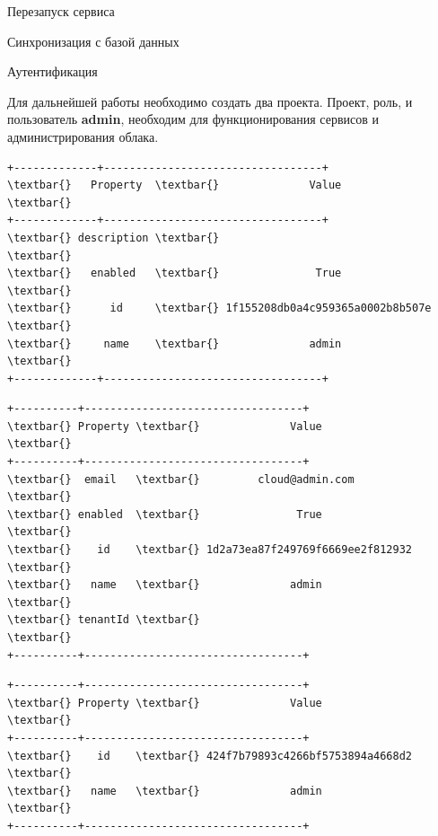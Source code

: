 \documentclass[letterpaper,10pt,russian]{sphinxmanual}
\begin{document}
Перезапуск сервиса


Синхронизация с базой данных


Аутентификация



Для дальнейшей работы необходимо создать два проекта. Проект, роль, и пользователь \textbf{admin}, необходим для функционирования сервисов и администрирования облака.


\begin{Verbatim}[commandchars=\\\{\}]
+-------------+----------------------------------+
\textbar{}   Property  \textbar{}              Value               \textbar{}
+-------------+----------------------------------+
\textbar{} description \textbar{}                                  \textbar{}
\textbar{}   enabled   \textbar{}               True               \textbar{}
\textbar{}      id     \textbar{} 1f155208db0a4c959365a0002b8b507e \textbar{}
\textbar{}     name    \textbar{}              admin               \textbar{}
+-------------+----------------------------------+
\end{Verbatim}


\begin{Verbatim}[commandchars=\\\{\}]
+----------+----------------------------------+
\textbar{} Property \textbar{}              Value               \textbar{}
+----------+----------------------------------+
\textbar{}  email   \textbar{}         cloud@admin.com          \textbar{}
\textbar{} enabled  \textbar{}               True               \textbar{}
\textbar{}    id    \textbar{} 1d2a73ea87f249769f6669ee2f812932 \textbar{}
\textbar{}   name   \textbar{}              admin               \textbar{}
\textbar{} tenantId \textbar{}                                  \textbar{}
+----------+----------------------------------+
\end{Verbatim}


\begin{Verbatim}[commandchars=\\\{\}]
+----------+----------------------------------+
\textbar{} Property \textbar{}              Value               \textbar{}
+----------+----------------------------------+
\textbar{}    id    \textbar{} 424f7b79893c4266bf5753894a4668d2 \textbar{}
\textbar{}   name   \textbar{}              admin               \textbar{}
+----------+----------------------------------+
\end{Verbatim}
\end{document}
